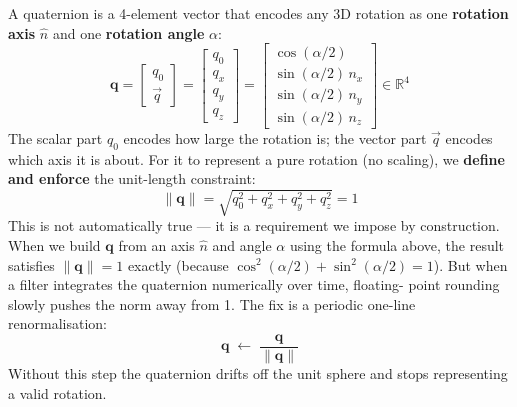 \documentclass[12pt, a4paper]{article}
\begin{document}
A quaternion is a 4-element vector that encodes any 3D rotation as one
\textbf{rotation axis} $\hat{n}$ and one \textbf{rotation angle} $\alpha$:
\[
  \mathbf{q}
  = \begin{bmatrix} q_0 \\ \vec{q} \end{bmatrix}
  = \begin{bmatrix} q_0 \\ q_x \\ q_y \\ q_z \end{bmatrix}
  = \begin{bmatrix} \cos(\alpha/2) \\ \sin(\alpha/2)\,n_x \\
                    \sin(\alpha/2)\,n_y \\ \sin(\alpha/2)\,n_z \end{bmatrix}
  \in \mathbb{R}^4
\]
The scalar part $q_0$ encodes how large the rotation is; the vector part
$\vec{q}$ encodes which axis it is about.
For it to represent a pure rotation (no scaling), we \textbf{define and
enforce} the unit-length constraint:
\[
  \|\mathbf{q}\| = \sqrt{q_0^2 + q_x^2 + q_y^2 + q_z^2} = 1
\]
This is not automatically true --- it is a requirement we impose by
construction.
When we build $\mathbf{q}$ from an axis $\hat{n}$ and angle $\alpha$ using
the formula above, the result satisfies $\|\mathbf{q}\|=1$ exactly
(because $\cos^2(\alpha/2) + \sin^2(\alpha/2) = 1$).
But when a filter integrates the quaternion numerically over time, floating-
point rounding slowly pushes the norm away from 1.
The fix is a periodic one-line renormalisation:
\[
  \mathbf{q} \;\leftarrow\; \frac{\mathbf{q}}{\|\mathbf{q}\|}
\]
Without this step the quaternion drifts off the unit sphere and stops
representing a valid rotation.
\end{document}
